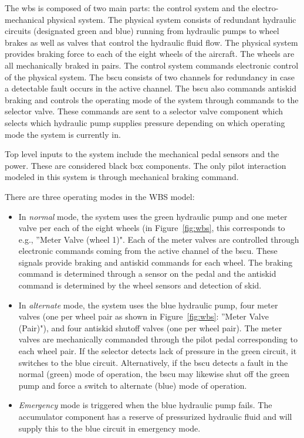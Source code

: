 The \gls{wbs} is composed of two main parts: the control system and the electro-mechanical physical system. The physical system consists of redundant hydraulic circuits (designated green and blue) running from hydraulic pumps to wheel brakes as well as valves that control the hydraulic fluid flow. The physical system provides braking force to each of the eight wheels of the aircraft. The wheels are all mechanically braked in pairs. The control system commands electronic control of the physical system. %
The \gls{bscu} consists of two channels for redundancy in case a detectable fault occurs in the active channel. The \gls{bscu} also commands antiskid braking and controls the operating mode of the system through commands to the selector valve. These commands are sent to a selector valve component which selects which hydraulic pump supplies pressure depending on which operating mode the system is currently in. 

Top level inputs to the system include the mechanical pedal sensors and the power. These are considered black box components. The only pilot interaction modeled in this system is through mechanical braking command.

There are three operating modes in the WBS model:

\begin{itemize}
	\renewcommand{\labelitemi}{\textbullet}
	\item In \textit{normal} mode, the system uses the green hydraulic pump and one meter valve per each of the eight wheels (in Figure~\ref{fig:wbs}, this corresponds to e.g., ''Meter Valve (wheel 1)". Each of the meter valves are controlled through electronic commands coming from the active channel of the \gls{bscu}. These signals provide braking and antiskid commands for each wheel. The braking command is determined through a sensor on the pedal and the antiskid command is determined by the wheel sensors and detection of skid. 
	\item In \textit{alternate} mode, the system uses the blue hydraulic pump, four meter valves (one per wheel pair as shown in Figure~\ref{fig:wbs}: ''Meter Valve (Pair)"), and four antiskid shutoff valves (one per wheel pair). The meter valves are mechanically commanded through the pilot pedal corresponding to each wheel pair. If the selector detects lack of pressure in the green circuit, it switches to the blue circuit. Alternatively, if the \gls{bscu} detects a fault in the normal (green) mode of operation, the \gls{bscu} may likewise shut off the green pump and force a switch to alternate (blue) mode of operation. 
	\item \textit{Emergency} mode is triggered when the blue hydraulic pump fails. The accumulator component has a reserve of pressurized hydraulic fluid and will supply this to the blue circuit in emergency mode. 
\end{itemize}

